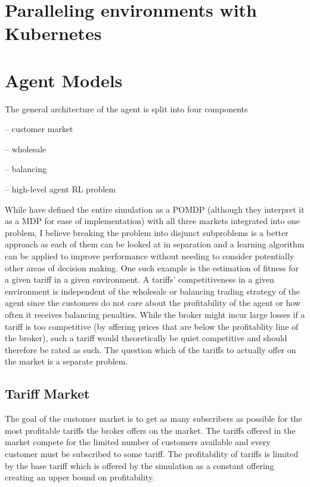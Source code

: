 \section{Paralleling environments with Kubernetes}

\section{Agent Models}

The general architecture of the agent is split into four components

-- customer market

-- wholesale 

-- balancing 

-- high-level agent \ac {RL} problem

While \citet{tactexurieli2016mdp} have defined the entire simulation as a \ac {POMDP} (although they interpret it as a \ac {MDP} for ease of implementation) with all three markets
integrated into one problem, I believe breaking the problem into disjunct subproblems is a better approach as each of
them can be looked at in separation and a learning algorithm can be applied to improve performance without needing to
consider potentially other areas of decision making. One such example is the estimation of fitness for a given tariff in
a given environment. A tariffs' competitiveness in a given environment is independent of the wholesale or balancing
trading strategy of the agent since the customers do not care about the profitability of the agent or how often it
receives balancing penalties. While the broker might incur large losses if a tariff is too competitive (by offering prices that are below the profitablity line of the broker), such a tariff would theoretically be quiet competitive and should therefore be rated as such. The question which of the tariffs to actually offer on the market is a separate problem.

\subsection{Tariff Market}

The goal of the customer market is to get as many subscribers as possible for the most profitable tariffs the broker
offers on the market. The tariffs offered in the market compete for the limited number of customers available and every
customer must be subscribed to some tariff. The profitability of tariffs is limited by the base tariff which is offered
by the simulation as a constant offering creating an upper bound on profitability. 

